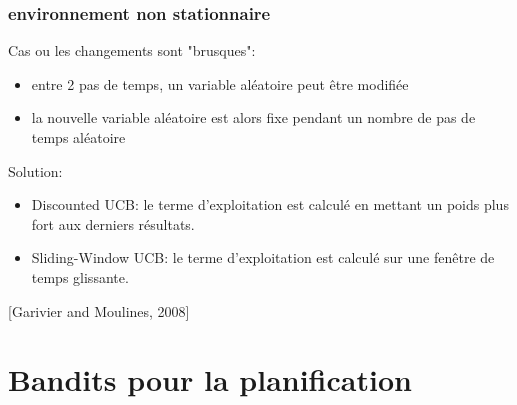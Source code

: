 \documentclass{beamer}
\begin{document}
\begin{frame}
    \frametitle{environnement non stationnaire}

    Cas ou les changements sont "brusques":
    \begin{itemize}
        \item entre 2 pas de temps, un variable aléatoire peut être modifiée
        \item la nouvelle variable aléatoire est alors fixe pendant un nombre de pas de temps aléatoire
    \end{itemize}

    Solution:
    \begin{itemize}
        \item Discounted UCB:
            le terme d'exploitation est calculé en mettant un poids plus fort aux derniers résultats.
        \item Sliding-Window UCB:
            le terme d'exploitation est calculé sur une fenêtre de temps glissante.
    \end{itemize}

    \hfill [Garivier and Moulines, 2008]

\end{frame}

\section{Bandits pour la planification}
\end{document}
